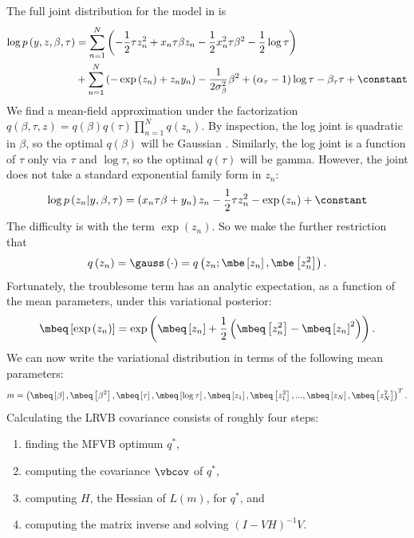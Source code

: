 The full joint distribution for the model in  is
%
\begin{align*}
\log p\left(y,z,\beta,\tau\right) &= \sum_{n=1}^{N}\left(-\frac{1}{2}\tau z_{n}^{2}+x_{n}\tau\beta z_{n}-\frac{1}{2}x_{n}^{2}\tau\beta^{2}-\frac{1}{2}\log\tau\right)\\
 &+\sum_{n=1}^{N}\left(-\exp\left(z_{n}\right)+z_{n}y_{n}\right)
 -\frac{1}{2\sigma_{\beta}^{2}}\beta^{2}+\left(\alpha_{\tau}-1\right)\log\tau-\beta_{\tau}\tau+\constant
\end{align*}
%
We find a mean-field approximation under the factorization
$q\left(\beta,\tau,z\right) =
q\left(\beta\right)q\left(\tau\right)\prod_{n=1}^{N}q\left(z_{n}\right)$. By
inspection, the log joint is quadratic in $\beta$, so the optimal
$q\left(\beta\right)$ will be Gaussian \cite{bishop:2006:pattern}. Similarly, the
log joint is a function of $\tau$ only via $\tau$ and $\log\tau$, so the optimal
$q\left(\tau\right)$ will be gamma. However, the joint does not take a standard
exponential family form in $z_n$:
%
$$
  \log p\left(z_{n}\vert y,\beta,\tau\right) = \left(x_{n}\tau\beta+y_{n}\right)z_{n}-\frac{1}{2}\tau z_{n}^{2}-\exp\left(z_{n}\right)+\constant
$$
%
The difficulty is with the term $\exp\left(z_{n}\right)$. So we make the further
restriction that
%
$$
  q\left(z_{n}\right) = \gauss\left(\cdot\right)=q\left(z_{n};\mbe\left[z_{n}\right],\mbe\left[z_{n}^{2}\right]\right).
$$
%
Fortunately, the troublesome term has an analytic expectation, as
a function of the mean parameters, under this variational posterior:
%
$$
  \mbeq\left[\exp\left(z_{n}\right)\right] = \exp\left(\mbeq\left[z_{n}\right]+\frac{1}{2}\left(\mbeq\left[z_{n}^{2}\right]-\mbeq\left[z_{n}\right]^{2}\right)\right).
$$
%
We can now write the variational distribution in terms of the following
mean parameters:
%
$$
  m = \left(\mbeq\left[\beta\right],\mbeq\left[\beta^{2}\right],\mbeq\left[\tau\right],\mbeq\left[\log\tau\right],\mbeq\left[z_{1}\right],\mbeq\left[z_{1}^{2}\right],...,\mbeq\left[z_{N}\right],\mbeq\left[z_{N}^{2}\right]\right)^{T}.
$$
%
Calculating the LRVB covariance consists of roughly four steps:

\begin{enumerate}
\item finding the MFVB optimum $q^{*}$,
\item computing the covariance $\vbcov$ of $q^*$,
\item computing $H$, the Hessian of $L(m)$, for $q^*$, and
\item computing the matrix inverse and solving $\left(I-VH\right)^{-1}V$.
\end{enumerate}

